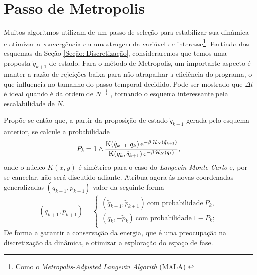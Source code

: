 \section{Passo de Metropolis}
\label{Section: Metropolis}

Muitos algoritmos utilizam de um passo de seleção para estabilizar sua dinâmica e otimizar a convergência e a amostragem da variável de interesse\footnote{Como o \textit{Metropolis-Adjusted Langevin Algorith} (MALA) \cite[Anexo~C]{leimmolecular}}. Partindo dos esquemas da Seção \ref{Seção: Discretização}, consideraremos que temos uma proposta $\tilde{q}_{k+1}$ de estado. Para o método de Metropolis, um importante aspecto é manter a razão de rejeições baixa para não atrapalhar a eficiência do programa, o que influencia no tamanho do passo temporal decidido. Pode ser mostrado que $\Delta t$ é ideal quando é da ordem de $N^{-\frac{1}{4}}$ \cite{Chafa2018}, tornando o esquema interessante pela escalabilidade de $N$.

Propõe-se então que, a partir da proposição de estado $\tilde{q}_{k+1}$ gerada pelo esquema anterior, se calcule a probabilidade
\begin{equation}
P_k = 1 \wedge \frac{\operatorname{K}(\tilde{q}_{k+1}, q_k) \operatorname{e}^{-\beta \operatorname{\mathcal{H}}_N(\tilde{q}_{k+1})}}{\operatorname{K}(q_k, \tilde{q}_{k+1}) \operatorname{e}^{-\beta \operatorname{\mathcal{H}}_N(q_{k})}},
\label{Equation: Pk}
\end{equation}
onde o núcleo $K(x, y)$ é simétrico \cite{Chafa2018} para o caso do \textit{Langevin Monte Carlo} e, por se cancelar, não será discutido adiante. Atribua agora às novas coordenadas generalizadas $(q_{k+1}, p_{k+1})$ valor da seguinte forma
\begin{equation}
	(q_{k+1}, p_{k+1}) =
\begin{cases}
	(\tilde{q}_{k+1}, \tilde{p}_{k+1}) \ \text{com probabilidade} \ P_k, \\
	(q_k, -\tilde{p}_{k}) \ \text{com probabilidade} \ 1-P_k; \\
\end{cases}
\label{Equation: Metropolis}
\end{equation}
De forma a garantir a conservação da energia, que é uma preocupação na discretização da dinâmica, e otimizar a exploração do espaço de fase.